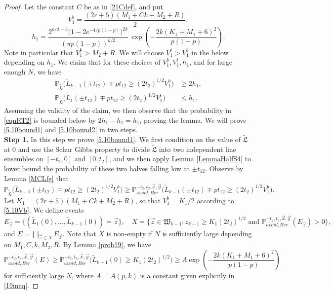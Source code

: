 \begin{proof}
	
	Let the constant $C$ be as in \eqref{21Cdef}, and put
	\begin{equation}\label{5.10Vb}
	V_1^b = \frac{(2r+5)(M_1 + Ck + M_2 + R)}{2},
	\end{equation}
	\begin{equation}\label{5.10h1}
	h_1 =  \frac{2^{k/2-5}\big(1-2e^{-4/p(1-p)}\big)^{2k}}{(\pi p(1-p))^{k/2}}\,\exp\left(-\frac{2k(K_1+M_1+6)^2}{p(1-p)}\right).
	\end{equation}
	Note in particular that $V_1^b > M_2 + R$. We will choose $V_1^t > V_1^b$ in the below depending on $h_1$. We claim that for these choices of  $V_1^b, V_1^t, h_1$, and for large enough $N$, we have 
	\begin{align}
	\mathbb{P}_{\tilde{\mathfrak{L}}}\Big(\tilde{L}_{k-1}(\pm t_{12}) \mp pt_{12} \geq (2t_2)^{1/2}V_1^b\Big) &\geq 2h_1, \label{5.10bound1}\\
	\mathbb{P}_{\tilde{\mathfrak{L}}}\Big(\tilde{L}_1(\pm t_{12}) \mp pt_{12} \geq (2t_2)^{1/2}V_1^t\Big) &\leq h_1. \label{5.10bound2}
	\end{align}
	Assuming the validity of the claim, we then observe that the probability in \eqref{eqnRT2} is bounded below by $2h_1 - h_1 = h_1$, proving the lemma. We will prove \eqref{5.10bound1} and \eqref{5.10bound2} in two steps.\\
	
	\noindent\textbf{Step 1.} In this step we prove \eqref{5.10bound1}. We first condition on the value of $\tilde{\mathfrak{L}}$ at 0 and use the Schur Gibbs property to divide $\tilde{\mathfrak{L}}$ into two independent line ensembles on $[-t_2,0]$ and $[0,t_2]$, and we then apply Lemma \ref{LemmaHalfS4} to lower bound the probability of these two halves falling low at $\pm t_{12}$. Observe by Lemma \ref{MCLfg} that
	\[
	\mathbb{P}_{\tilde{\mathfrak{L}}}\Big(\tilde{L}_{k-1}(\pm t_{12}) \mp pt_{12} \geq (2t_2)^{1/2}V_1^b\Big) \geq \mathbb{P}^{-t_2,t_2,\vec{x},\vec{y}}_{avoid, Ber}\Big(\tilde{L}_{k-1}(\pm t_{12}) \mp pt_{12} \geq (2t_2)^{1/2}V_1^b\Big).
	\]
	Let $K_1 = (2r+5)(M_1+Ck+M_2+R)$, so that $V_1^b = K_1/2$ according to \eqref{5.10Vb}. We define events
	\[
	E_{\vec{z}} = \big\{(\tilde{L}_1(0),\dots,\tilde{L}_{k-1}(0)) = \vec{z}\big\}, \quad X = \Big\{ \vec{z}\in\mathfrak{W}_{k-1} : z_{k-1} \geq K_1(2t_2)^{1/2} \mbox { and } \mathbb{P}^{-t_2,t_2,\vec{x},\vec{y}}_{avoid,Ber}(E_{\vec{z}}) > 0\Big\},
	\]
	and $E = \bigsqcup_{\vec{z} \in X} E_{\vec{z}}$. Note that $X$ is non-empty if $N$ is sufficiently large depending on $M_1,C,k,M_2,R$. By Lemma \ref{prob19}, we have
	\begin{equation}\label{5.10Ebound}
	\mathbb{P}^{-t_2,t_2,\vec{x},\vec{y}}_{avoid, Ber}(E) \geq \mathbb{P}^{-t_2,t_2,\vec{x},\vec{y}}_{avoid,Ber}\Big(\tilde{L}_{k-1}(0) \geq K_1(2t_2)^{1/2}\Big) \geq A\exp\left(-\frac{2k(K_1+M_1+6)^2}{p(1-p)}\right)
	\end{equation}
	for sufficiently large $N$, where $A = A(p,k)$ is a constant given explicitly in \eqref{19ineq}.
	

\end{proof}
